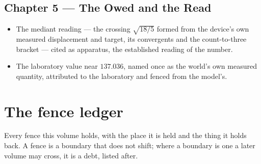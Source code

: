 \subsection*{Chapter 5 --- The Owed and the Read}
\begin{itemize}
\item The mediant reading --- the crossing $\sqrt{18/5}$ formed from the device's
own measured displacement and target, its convergents and the count-to-three
bracket --- cited as apparatus, the established reading of the number.
\item The laboratory value near $137.036$, named once as the world's own measured
quantity, attributed to the laboratory and fenced from the model's.
\end{itemize}

\section*{The fence ledger}

Every fence this volume holds, with the place it is held and the thing it holds
back. A fence is a boundary that does not shift; where a boundary is one a later
volume may cross, it is a debt, listed after.

